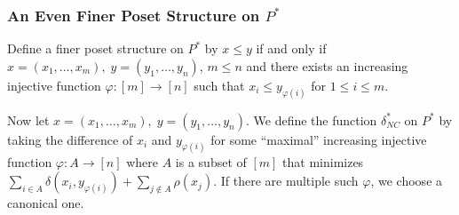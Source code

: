 \documentclass[acmsmall,review,anonymous]{acmart}\settopmatter{printfolios=true,printccs=false,printacmref=false}
\begin{document}
\subsubsection{An Even Finer Poset Structure on $P^*$}\label{nocrossing}
Define a finer poset structure on $P^*$ by $x \leq y$ if
and only if $x = (x_1, \ldots, x_m), \; y = (y_1, \ldots, y_n)$, $m \leq n$ and
there exists an increasing injective function $\varphi : [m] \longrightarrow
[n]$ such that $x_i \leq y_{\varphi(i)}$ for $1 \leq i \leq m$.

Now let $x = (x_1, \ldots, x_m), \; y = (y_1, \ldots, y_n)$. We define the
function $\delta_{NC}^*$ on $P^*$ by taking the difference of $x_i$ and
$y_{\varphi(i)}$ for some ``maximal'' increasing injective function $\varphi :
A \longrightarrow [n]$ where $A$ is a subset of $[m]$ that minimizes $\sum_{i \in
A }\delta(x_i, y_{\varphi(i)}) + \sum_{j \not \in A}\rho(x_j)$. If there are
multiple such $\varphi$, we choose a canonical one.
\end{document}
